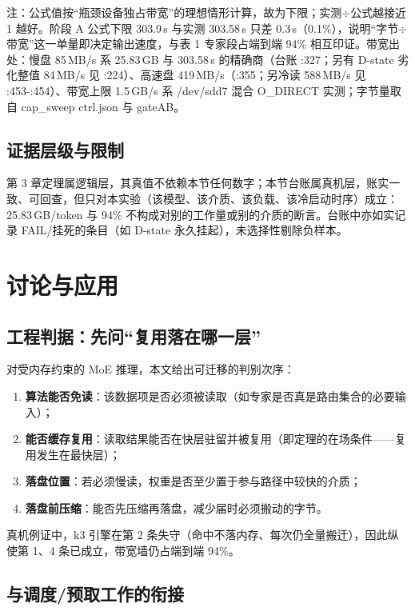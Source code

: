 \documentclass[11pt]{ctexart}
\begin{document}
注：公式值按“瓶颈设备独占带宽”的理想情形计算，故为下限；实测$\div$公式越接近 1 越好。阶段 A 公式下限 303.9\,s 与实测 303.58\,s 只差 0.3\,s（0.1\%），说明“字节$\div$带宽”这一单量即决定输出速度，与表 1 专家段占端到端 94\% 相互印证。带宽出处：慢盘 85\,MB/s 系 25.83\,GB 与 303.58\,s 的精确商（台账 :327；另有 D-state 劣化整值 84\,MB/s 见 :224）、高速盘 419\,MB/s（:355；另冷读 588\,MB/s 见 :453-:454）、带宽上限 1.5\,GB/s 系 /dev/sdd7 混合 O\_DIRECT 实测；字节量取自 cap\_sweep ctrl.json 与 gateAB。

\subsection{证据层级与限制}

第 3 章定理属逻辑层，其真值不依赖本节任何数字；本节台账属真机层，账实一致、可回查，但只对本实验（该模型、该介质、该负载、该冷启动时序）成立：25.83\,GB/token 与 94\% 不构成对别的工作量或别的介质的断言。台账中亦如实记录 FAIL/挂死的条目（如 D-state 永久挂起），未选择性剔除负样本。

\section{讨论与应用}

\subsection{工程判据：先问“复用落在哪一层”}

对受内存约束的 MoE 推理，本文给出可迁移的判别次序：
\begin{enumerate}
\item \textbf{算法能否免读}：该数据项是否必须被读取（如专家是否真是路由集合的必要输入）；
\item \textbf{能否缓存复用}：读取结果能否在快层驻留并被复用（即定理的在场条件——复用发生在最快层）；
\item \textbf{落盘位置}：若必须慢读，权重是否至少置于参与路径中较快的介质；
\item \textbf{落盘前压缩}：能否先压缩再落盘，减少届时必须搬动的字节。
\end{enumerate}
真机例证中，k3 引擎在第 2 条失守（命中不落内存、每次仍全量搬迁），因此纵使第 1、4 条已成立，带宽墙仍占端到端 94\%。

\subsection{与调度/预取工作的衔接}
\end{document}
